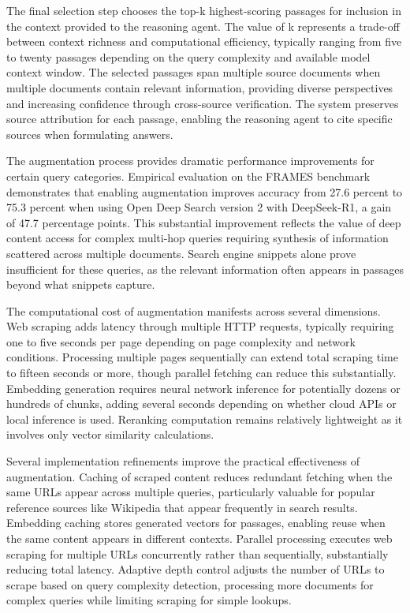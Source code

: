 The final selection step chooses the top-k highest-scoring passages for inclusion in the context provided to the reasoning agent. The value of k represents a trade-off between context richness and computational efficiency, typically ranging from five to twenty passages depending on the query complexity and available model context window. The selected passages span multiple source documents when multiple documents contain relevant information, providing diverse perspectives and increasing confidence through cross-source verification. The system preserves source attribution for each passage, enabling the reasoning agent to cite specific sources when formulating answers.

The augmentation process provides dramatic performance improvements for certain query categories. Empirical evaluation on the FRAMES benchmark demonstrates that enabling augmentation improves accuracy from 27.6 percent to 75.3 percent when using Open Deep Search version 2 with DeepSeek-R1, a gain of 47.7 percentage points. This substantial improvement reflects the value of deep content access for complex multi-hop queries requiring synthesis of information scattered across multiple documents. Search engine snippets alone prove insufficient for these queries, as the relevant information often appears in passages beyond what snippets capture.

The computational cost of augmentation manifests across several dimensions. Web scraping adds latency through multiple HTTP requests, typically requiring one to five seconds per page depending on page complexity and network conditions. Processing multiple pages sequentially can extend total scraping time to fifteen seconds or more, though parallel fetching can reduce this substantially. Embedding generation requires neural network inference for potentially dozens or hundreds of chunks, adding several seconds depending on whether cloud APIs or local inference is used. Reranking computation remains relatively lightweight as it involves only vector similarity calculations.

Several implementation refinements improve the practical effectiveness of augmentation. Caching of scraped content reduces redundant fetching when the same URLs appear across multiple queries, particularly valuable for popular reference sources like Wikipedia that appear frequently in search results. Embedding caching stores generated vectors for passages, enabling reuse when the same content appears in different contexts. Parallel processing executes web scraping for multiple URLs concurrently rather than sequentially, substantially reducing total latency. Adaptive depth control adjusts the number of URLs to scrape based on query complexity detection, processing more documents for complex queries while limiting scraping for simple lookups.

